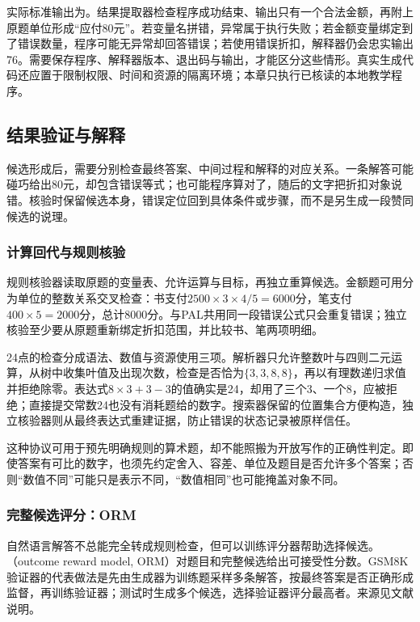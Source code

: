 实际标准输出为。结果提取器检查程序成功结束、输出只有一个合法金额，再附上原题单位形成“应付80元”。若变量名拼错，异常属于执行失败；若金额变量绑定到了错误数量，程序可能无异常却回答错误；若使用错误折扣，解释器仍会忠实输出76。需要保存程序、解释器版本、退出码与输出，才能区分这些情形。真实生成代码还应置于限制权限、时间和资源的隔离环境；本章只执行已核读的本地教学程序。

\subsection{结果验证与解释}
\label{sec:nlp-execution-verification}

候选形成后，需要分别检查最终答案、中间过程和解释的对应关系。一条解答可能碰巧给出80元，却包含错误等式；也可能程序算对了，随后的文字把折扣对象说错。核验时保留候选本身，错误定位回到具体条件或步骤，而不是另生成一段赞同候选的说理。

\subsubsection{计算回代与规则核验}
\label{sec:nlp-execution-rule-check}

规则核验器读取原题的变量表、允许运算与目标，再独立重算候选。金额题可用分为单位的整数关系交叉检查：书支付$2500\times3\times4/5=6000$分，笔支付$400\times5=2000$分，总计8000分。与PAL共用同一段错误公式只会重复错误；独立核验至少要从原题重新绑定折扣范围，并比较书、笔两项明细。

24点的检查分成语法、数值与资源使用三项。解析器只允许整数叶与四则二元运算，从树中收集叶值及出现次数，检查是否恰为$\{3,3,8,8\}$，再以有理数递归求值并拒绝除零。表达式$8\times3+3-3$的值确实是24，却用了三个3、一个8，应被拒绝；直接提交常数24也没有消耗题给的数字。搜索器保留的位置集合方便构造，独立核验器则从最终表达式重建证据，防止错误的状态记录被原样信任。

这种协议可用于预先明确规则的算术题，却不能照搬为开放写作的正确性判定。即使答案有可比的数字，也须先约定舍入、容差、单位及题目是否允许多个答案；否则“数值不同”可能只是表示不同，“数值相同”也可能掩盖对象不同。

\subsubsection{完整候选评分：ORM}
\label{sec:nlp-execution-orm}

自然语言解答不总能完全转成规则检查，但可以训练评分器帮助选择候选。（outcome reward model, ORM）对题目和完整候选给出可接受性分数。GSM8K验证器的代表做法是先由生成器为训练题采样多条解答，按最终答案是否正确形成监督，再训练验证器；测试时生成多个候选，选择验证器评分最高者。来源见文献说明。

